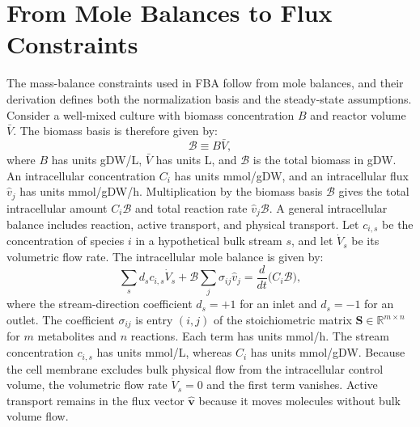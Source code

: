 \section{From Mole Balances to Flux Constraints}\label{sec:derivation}

The mass-balance constraints used in FBA follow from mole balances, and their
derivation defines both the normalization basis and the steady-state
assumptions. Consider a
well-mixed culture with biomass concentration $B$ and reactor volume
$\bar V$. The biomass basis is therefore given by:
\begin{equation}\label{eq:biomass-basis}
  \mathcal B \equiv B\bar V,
\end{equation}
where $B$ has units gDW/L, $\bar V$ has units L, and $\mathcal B$ is the
total biomass in gDW. An intracellular concentration $C_i$ has units
mmol/gDW, and an intracellular flux $\hat v_j$ has units mmol/gDW/h.
Multiplication by the biomass basis $\mathcal B$ gives the total
intracellular amount $C_i\mathcal B$ and total reaction rate
$\hat v_j\mathcal B$. A general
intracellular balance includes reaction, active transport, and
physical transport. Let $c_{i,s}$ be the concentration of species $i$ in a
hypothetical bulk stream $s$, and let $\dot V_s$ be its volumetric flow
rate. The intracellular mole balance is given by:
\begin{equation}\label{eq:mole-balance}
  \sum_s d_s c_{i,s}\dot V_s
  + \mathcal B\sum_j\sigma_{ij}\hat v_j
  = \frac{d}{dt}\bigl(C_i\mathcal B\bigr),
\end{equation}
where the stream-direction coefficient $d_s=+1$ for an inlet and $d_s=-1$
for an outlet. The coefficient $\sigma_{ij}$ is entry $(i,j)$ of the
stoichiometric matrix $\mathbf S\in\mathbb R^{m\times n}$ for $m$ metabolites
and $n$ reactions. Each term has units mmol/h. The stream concentration
$c_{i,s}$ has units mmol/L, whereas $C_i$ has units mmol/gDW. Because the cell membrane excludes
bulk physical flow from the intracellular control volume, the volumetric flow
rate $\dot V_s=0$ and the first term vanishes. Active transport remains in the
flux vector $\hat{\mathbf v}$ because it moves molecules without bulk volume
flow.

